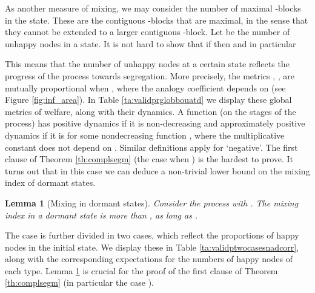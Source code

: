 \documentclass[11pt]{article}
\theoremstyle{plain}
\newtheorem{lem}[thm]{Lemma}
\numberwithin{equation}{subsection}
\begin{document}
As another measure of mixing, we may consider the number
 of maximal -blocks in the state. These are the contiguous -blocks
that are maximal, in the sense that they cannot be extended to a larger contiguous -block.
Let  be the number of unhappy nodes in a state.
It is not hard to show that if   then  and in particular

This means that the number of unhappy nodes at a certain state reflects
the progress of the process towards segregation.
More precisely,
the metrics , ,  are mutually proportional when
, where the analogy coefficient depends on  (see Figure \ref{fig:inf_area}). 
In Table \ref{ta:validprglobbouatd} we display these global metrics of welfare,
along with their dynamics. A function (on the stages of the process) 
has positive dynamics if it is non-decreasing
and approximately positive dynamics if it
is  for some nondecreasing function , where the multiplicative constant does not depend on .
Similar definitions apply for `negative'.
The first clause of Theorem \ref{th:complsegm} (the case when )
is the hardest to prove. 
It turns out that in this case  we can
deduce a non-trivial lower bound on the mixing index of dormant states.
\begin{lem}[Mixing in dormant states]\label{le:mixindorsta}
Consider the process  with . The  
mixing index in a dormant state is more than ,
as long as .
\end{lem}

The case  is further divided in two cases, which reflect the
proportions of happy nodes in the initial state. We display these in 
Table \ref{ta:validptwocasesnadcorr}, along with the corresponding 
expectations for the numbers of happy nodes of each type.
Lemma \ref{le:mixindorsta} is crucial  
for the proof of the first clause of Theorem \ref{th:complsegm}
(in particular the  case ).
\end{document}
